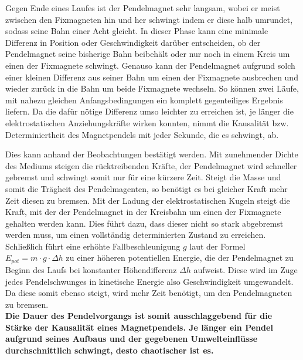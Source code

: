 Gegen Ende eines Laufes ist der Pendelmagnet sehr langsam, wobei er meist zwischen den Fixmagneten hin und her schwingt indem er diese halb umrundet, sodass seine Bahn einer Acht gleicht. In dieser Phase kann eine minimale Differenz in Position oder Geschwindigkeit darüber entscheiden, ob der Pendelmagnet seine bisherige Bahn beibehält oder nur noch in einem Kreis um einen der Fixmagnete schwingt. Genauso kann der Pendelmagnet aufgrund solch einer kleinen Differenz aus seiner Bahn um einen der Fixmagnete ausbrechen und wieder zurück in die Bahn um beide Fixmagnete wechseln. So können zwei Läufe, mit nahezu gleichen Anfangsbedingungen ein komplett gegenteiliges Ergebnis liefern. Da die dafür nötige Differenz umso leichter zu erreichen ist, je länger die elektrostatischen Anziehungskräfte wirken konnten, nimmt die Kausalität bzw. Determiniertheit des Magnetpendels mit jeder Sekunde, die es schwingt, ab.

Dies kann anhand der Beobachtungen bestätigt werden. Mit zunehmender Dichte des Mediums steigen die rücktreibenden Kräfte, der Pendelmagnet wird schneller gebremst und schwingt somit nur für eine kürzere Zeit. Steigt die Masse und somit die Trägheit des Pendelmagenten, so benötigt es bei gleicher Kraft mehr Zeit diesen zu bremsen. Mit der Ladung der elektrostatischen Kugeln steigt die Kraft, mit der der Pendelmagnet in der Kreisbahn um einen der Fixmagnete gehalten werden kann. Dies führt dazu, dass dieser nicht so stark abgebremst werden muss, um einen vollständig determinierten Zustand zu erreichen. Schließlich führt eine erhöhte Fallbeschleunigung $g$ laut der Formel $E_{pot} = m \cdot g \cdot \Delta h$ zu einer höheren potentiellen Energie, die der Pendelmagnet zu Beginn des Laufs bei konstanter Höhendifferenz $\Delta h$ aufweist. Diese wird im Zuge jedes Pendelschwunges in kinetische Energie also Geschwindigkeit umgewandelt. Da diese somit ebenso steigt, wird mehr Zeit benötigt, um den Pendelmagneten zu bremsen.\\

\textbf{Die Dauer des Pendelvorgangs ist somit ausschlaggebend für die Stärke der Kausalität eines Magnetpendels. Je länger ein Pendel aufgrund seines Aufbaus und der gegebenen Umwelteinflüsse durchschnittlich schwingt, desto chaotischer ist es.}
